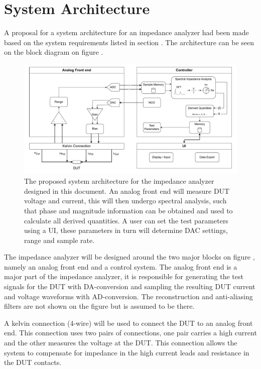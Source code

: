 \chapter{System Architecture} \label{ch:SysArchitecture}

A proposal for a system architecture for an impedance analyzer had been made based on the system requirements listed in section . The architecture can be seen on the block diagram on figure .  

\begin{figure}[H]
    \centering
    \includegraphics[width=1\textwidth]{Sections/6_SystemArchitecture/Figures/SystemArchitecture.pdf}
    \caption{The proposed system architecture for the impedance analyzer designed in this document. An analog front end will measure DUT voltage and current, 
    this will then undergo spectral analysis, such that phase and magnitude information can be obtained and used to calculate all derived quantities. A user can set the test parameters using a UI, these parameters in turn will determine DAC settings, range and sample rate.}
    \label{fig_6_SysArchitecture}
\end{figure}

The impedance analyzer will be designed around the two major blocks on figure , namely an analog front end and a control system. The analog front end is a major part of the impedance analyzer, it is responsible for generating the test signals for the DUT with DA-conversion and sampling the resulting DUT current and voltage waveforms with AD-conversion. The reconstruction and anti-aliasing filters are not shown on the figure but is assumed to be there.

A kelvin connection (4-wire) will be used to connect the DUT to an analog front end. This connection uses two pairs of connections, one pair carries a high current and the other measures the voltage at the DUT. This connection allows the system to compensate for impedance in the high current leads and resistance in the DUT contacts.

